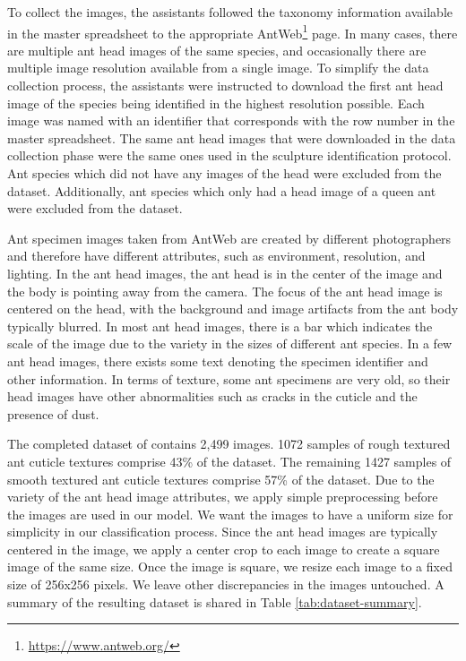 \documentclass{aci}
\numberwithin{equation}{section}
\begin{document}
To collect the images, the assistants followed the taxonomy information
available in the master spreadsheet to the appropriate
AntWeb\footnote{\url{https://www.antweb.org/}} page. In many cases, there are
multiple ant head images of the same species, and occasionally there are
multiple image resolution available from a single image. To simplify the data
collection process, the assistants were instructed to download the first ant
head image of the species being identified in the highest resolution possible.
Each image was named with an identifier that corresponds with the row number in
the master spreadsheet. The same ant head images that were downloaded in the
data collection phase were the same ones used in the sculpture identification
protocol. Ant species which did not have any images of the head were excluded
from the dataset. Additionally, ant species which only had a head image of a
queen ant were excluded from the dataset.

Ant specimen images taken from AntWeb \cite{perrichot_antweb_2012} are created
by different photographers and therefore have different attributes, such as
environment, resolution, and lighting. In the ant head images, the ant head is
in the center of the image and the body is pointing away from the camera. The
focus of the ant head image is centered on the head, with the background and
image artifacts from the ant body typically blurred. In most ant head images,
there is a bar which indicates the scale of the image due to the variety in the
sizes of different ant species. In a few ant head images, there exists some text
denoting the specimen identifier and other information. In terms of texture,
some ant specimens are very old, so their head images have other abnormalities
such as cracks in the cuticle and the presence of dust.

The completed dataset of contains 2,499 images. 1072 samples of rough textured
ant cuticle textures comprise 43\% of the dataset. The remaining 1427 samples of
smooth textured ant cuticle textures comprise 57\% of the dataset. Due to the
variety of the ant head image attributes, we apply simple preprocessing before
the images are used in our model. We want the images to have a uniform size for
simplicity in our classification process. Since the ant head images are
typically centered in the image, we apply a center crop to each image to create
a square image of the same size. Once the image is square, we resize each image
to a fixed size of 256x256 pixels. We leave other discrepancies in the images
untouched. A summary of the resulting dataset is shared in Table
\ref{tab:dataset-summary}.
\end{document}
